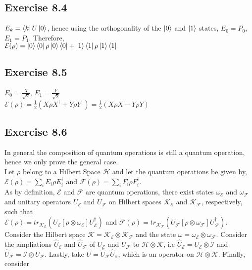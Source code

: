 \documentclass[a4paper,12pt]{article}
\begin{document}
\subsection*{Exercise 8.4}
$E_k=\bra{k}U\ket{0}$, hence using the orthogonality of the $\ket{0}$ and $\ket{1}$
states, $E_0=P_0$, $E_1=P_1$. Therefore,\\
$\mathcal{E}(\rho)=\ket{0}\bra{0}\rho \ket{0}\bra{0}+\ket{1}\bra{1}\rho \ket{1}\bra{1}$
\subsection*{Exercise 8.5}
$E_0=\frac{X}{\sqrt{2}}$, $E_1=\frac{Y}{\sqrt{2}}$\\
$\mathcal{E}(\rho)=\frac{1}{2}(X\rho X^\dagger + Y\rho Y^\dagger)=
\frac{1}{2}(X\rho X - Y\rho Y)$
\subsection*{Exercise 8.6}
In general the composition of quantum operations is still a quantum operation, hence we
only prove the general case.\\
Let $\rho$ belong to a Hilbert Space $\mathcal{H}$ and let the quantum operations be given by,
$\mathcal{E}(\rho)=\displaystyle \sum_i E_i \rho E_i^\dagger$ and
$\mathcal{F}(\rho)=\displaystyle \sum_i F_i \rho F_i^\dagger$.\\
As by definition, $\mathcal{E}$ and $\mathcal{F}$ are quantum operations, there exist states
$\omega_\mathcal{E}$ and $\omega_\mathcal{F}$ and unitary operators
$U_\mathcal{E}$ and $U_\mathcal{F}$ on Hilbert spaces
$\mathcal{K}_\mathcal{E}$ and $\mathcal{K}_\mathcal{F}$, respectively, such that\\
$\mathcal{E}(\rho)=tr_{\mathcal{K}_\mathcal{E}}(U_\mathcal{E}[\rho\otimes\omega_\mathcal{E}]U_\mathcal{E}^\dagger)$ and
$\mathcal{F}(\rho)=tr_{\mathcal{K}_\mathcal{F}}(U_\mathcal{F}[\rho\otimes\omega_\mathcal{F}]U_\mathcal{F}^\dagger)$.\\
Consider the Hilbert space $\mathcal{K}=\mathcal{K}_\mathcal{E}\otimes\mathcal{K}_\mathcal{F}$ and the state
$\omega=\omega_\mathcal{E}\otimes\omega_\mathcal{F}$. Consider the ampliations
$\hat{U}_\mathcal{E}$ and $\hat{U}_\mathcal{F}$ of $U_\mathcal{E}$ and $U_\mathcal{F}$ to
$\mathcal{H}\otimes\mathcal{K}$, i.e $\hat{U}_\mathcal{E}=U_\mathcal{E}\otimes \mathcal{I}$ and
$\hat{U}_\mathcal{F}=\mathcal{I}\otimes U_\mathcal{F}$. Lastly, take $U=\hat{U}_\mathcal{F} \hat{U}_\mathcal{E}$,
which is an operator on $\mathcal{H}\otimes\mathcal{K}$. Finally, consider\\
\end{document}

